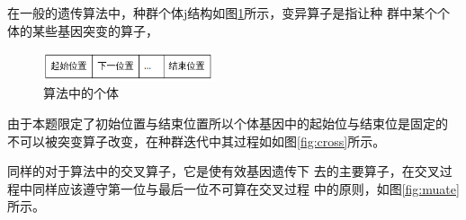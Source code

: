 \documentclass[fontset=windows,a4paper,12pt]{ctexart}
\begin{document}
      在一般的遗传算法中，种群个体j结构如图\ref{fig:life}所示，变异算子是指让种
      群中某个个体的某些基因突变的算子，
		\begin{figure}[htbp]
			\centering
			\includegraphics[width=5cm]{pic/life_struct.png}
			\caption{算法中的个体}
			\label{fig:life}
		\end{figure}
        由于本题限定了初始位置与结束位置所以个体基因中的起始位与结束位是固定的
        不可以被突变算子改变，在种群迭代中其过程如如图\ref{fig:cross}所示。
		
        同样的对于算法中的交叉算子，它是使有效基因遗传下
        去的主要算子，在交叉过程中同样应该遵守第一位与最后一位不可算在交叉过程
        中的原则，如图\ref{fig:muate}所示。
        
\end{document}
